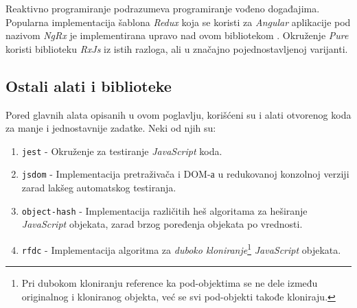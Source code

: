 \documentclass[12pt,oneside]{memoir}
\begin{document}
Reaktivno programiranje podrazumeva programiranje vođeno događajima. Popularna implementacija šablona \emph{Redux} koja se koristi za \emph{Angular} aplikacije
pod nazivom \emph{NgRx} je implementirana upravo nad ovom bibliotekom \cite{NgRx}. Okruženje \emph{Pure} koristi
biblioteku \emph{RxJs} iz istih razloga, ali u značajno pojednostavljenoj varijanti.
\subsection{Ostali alati i biblioteke}
Pored glavnih alata opisanih u ovom poglavlju, korišćeni su i alati otvorenog koda za manje i jednostavnije zadatke.
Neki od njih su:
\begin{enumerate}
  \item \texttt{jest} - Okruženje za testiranje \emph{JavaScript} koda.
  \item \texttt{jsdom} - Implementacija pretraživača i DOM-а u redukovanoj konzolnoj verziji zarad lakšeg automatskog testiranja.
  \item \texttt{object-hash} - Implementacija različitih heš algoritama za heširanje
  \emph{JavaScript} objekata, zarad brzog poređenja objekata po vrednosti.
  \item \texttt{rfdc} - Implementacija algoritma za \emph{duboko kloniranje}\footnote{Pri dubokom kloniranju reference ka pod-objektima se ne dele između originalnog i kloniranog objekta, već se svi pod-objekti takođe kloniraju.} \emph{JavaScript} objekata. 
\end{enumerate}
\end{document}
